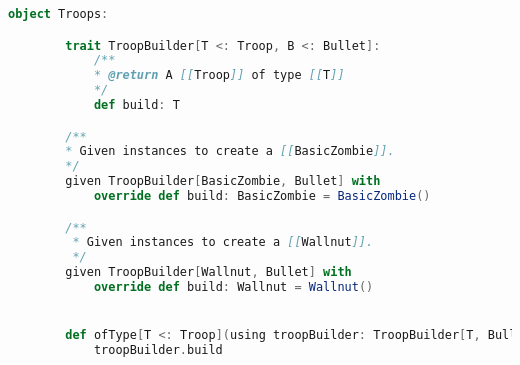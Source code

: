 \begin{lstlisting}[language=Scala, label=code:troop-builder, caption= Builder per la creazione di una Troop.]
    object Troops:

        trait TroopBuilder[T <: Troop, B <: Bullet]:
            /**
            * @return A [[Troop]] of type [[T]]
            */
            def build: T

        /**
        * Given instances to create a [[BasicZombie]].
        */
        given TroopBuilder[BasicZombie, Bullet] with
            override def build: BasicZombie = BasicZombie()

        /**
         * Given instances to create a [[Wallnut]].
         */
        given TroopBuilder[Wallnut, Bullet] with
            override def build: Wallnut = Wallnut()


        def ofType[T <: Troop](using troopBuilder: TroopBuilder[T, Bullet]): T =
            troopBuilder.build
\end{lstlisting}